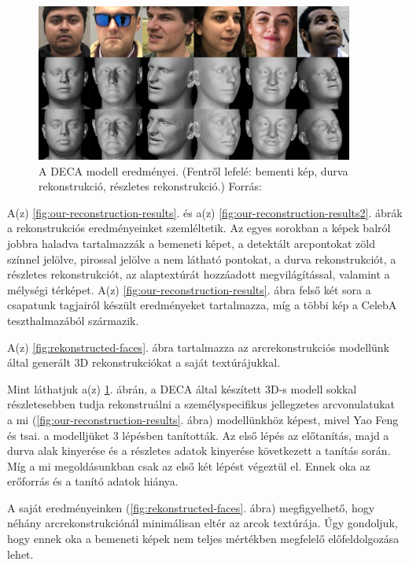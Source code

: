 \documentclass[12pt,a4]{article}
\begin{document}
             \begin{figure}[h]	
    		      \centering
    		      \includegraphics[width=1\linewidth]{deca_results2.png}
                \caption{A DECA modell eredményei. (Fentről lefelé: bementi kép, durva rekonstrukció, részletes rekonstrukció.) Forrás: \cite{deca}}
                \label{fig:decavisres}
    	       \end{figure} 
            \clearpage

            A(z) \ref{fig:our-reconstruction-results}. és a(z) \ref{fig:our-reconstruction-results2}. ábrák a rekonstrukciós eredményeinket szemléltetik. Az egyes sorokban a képek balról jobbra haladva tartalmazzák a bemeneti képet, a detektált arcpontokat zöld színnel jelölve, pirossal jelölve a nem látható pontokat, a durva rekonstrukciót, a részletes rekonstrukciót, az
            alaptextúrát hozzáadott megvilágítással, valamint a mélységi térképet.
            A(z) \ref{fig:our-reconstruction-results}. ábra felső két sora a csapatunk tagjairól készült eredményeket tartalmazza, míg a többi kép a CelebA teszthalmazából származik.

            A(z) \ref{fig:rekonstructed-faces}. ábra tartalmazza az arcrekonstrukciós modellünk által generált 3D rekonstrukciókat a saját textúrájukkal.

            Mint láthatjuk a(z) \ref{fig:decavisres}. ábrán, a DECA által készített 3D-s modell sokkal részletesebben tudja rekonstruálni a személyspecifikus jellegzetes arcvonulatukat a mi (\ref{fig:our-reconstruction-results}. ábra) modellünkhöz képest, mivel Yao Feng és tsai. a modelljüket 3 lépésben tanították. Az első lépés az előtanítás, majd a durva alak kinyerése és a részletes adatok kinyerése következett a tanítás során. Míg a mi megoldásunkban csak az első két lépést végeztül el. Ennek oka az erőforrás és a tanító adatok hiánya.

            A saját eredményeinken (\ref{fig:rekonstructed-faces}. ábra) megfigyelhető, hogy néhány arcrekonstrukciónál minimálisan eltér az arcok textúrája. Úgy gondoljuk, hogy ennek oka a bemeneti képek nem teljes mértékben megfelelő előfeldolgozása lehet.
\end{document}
